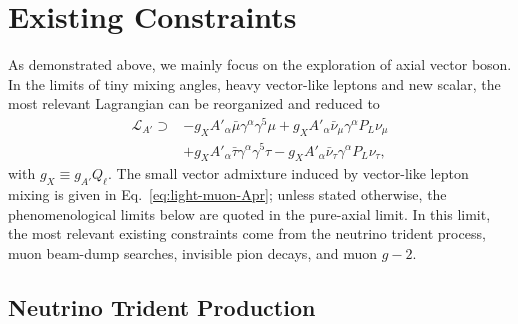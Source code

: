 \documentclass[onecolumn, aps, nofootinbib, prd, preprint, floats, floatfix, amsmath, amssymb, superscriptaddress, preprintnumbers]{revtex4-1}
\begin{document}
\section{Existing Constraints}
\label{sec:phenomenology}
As demonstrated above, we mainly focus on the exploration of axial vector boson. In the limits of tiny mixing angles, heavy vector-like leptons and new scalar, the most relevant Lagrangian can be reorganized and reduced to
\begin{equation}
\begin{aligned}
\mathcal{L}_{A'} \supset & -g_XA'_\alpha\bar\mu\gamma^\alpha\gamma^5\mu
+g_XA'_\alpha\bar\nu_\mu\gamma^\alpha P_L\nu_\mu \\
&+g_X A'_\alpha\bar\tau\gamma^\alpha\gamma^5\tau - g_X A'_\alpha\bar\nu_\tau\gamma^\alpha P_L\nu_\tau,
\end{aligned}
\label{eq:phenomenology-coupling-convention}
\end{equation}
with $g_X\equiv g_{A'} Q_\ell$. The small vector admixture induced by vector-like lepton mixing is given in Eq.~\eqref{eq:light-muon-Apr}; unless stated otherwise, the phenomenological limits below are quoted in the pure-axial limit. In this limit, the most relevant existing constraints come from the neutrino trident process, muon beam-dump searches, invisible pion decays, and muon $g-2$. 

\subsection{Neutrino Trident Production}
\label{subsec:trident}
\end{document}

